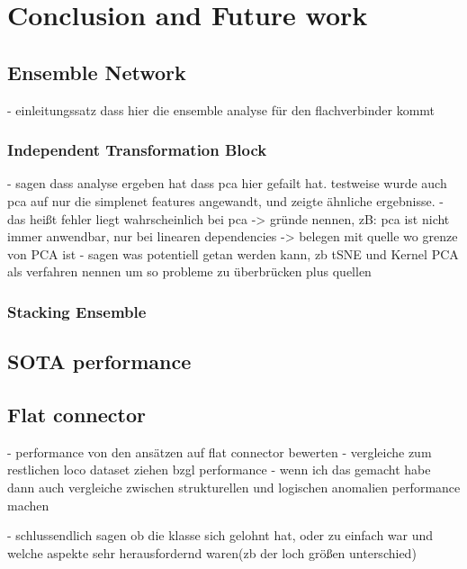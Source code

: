 \chapter{Conclusion and Future work}
\label{chap:conclusion}

\section{Ensemble Network}
\label{sec:ensembleconclusion}

- einleitungssatz dass hier die ensemble analyse für den flachverbinder kommt

\subsection{Independent Transformation Block}
\label{subsec:ITBfailconc}

- sagen dass analyse ergeben hat dass pca hier gefailt hat. testweise wurde auch pca auf nur die simplenet features angewandt, und zeigte ähnliche ergebnisse.
- das heißt fehler liegt wahrscheinlich bei pca
-> gründe nennen, zB: pca ist nicht immer anwendbar, nur bei linearen dependencies
-> belegen mit quelle wo grenze von PCA ist
- sagen was potentiell getan werden kann, zb tSNE und Kernel PCA als verfahren nennen um so probleme zu überbrücken plus quellen


\subsection{Stacking Ensemble}
\label{subsec:stackingconc}

\section{SOTA performance}
\label{sec:sotaperformanceconc}

\section{Flat connector}
\label{sec:flatconnectorconc}

- performance von den ansätzen auf flat connector bewerten
- vergleiche zum restlichen loco dataset ziehen bzgl performance
- wenn ich das gemacht habe dann auch vergleiche zwischen strukturellen und logischen anomalien performance machen

- schlussendlich sagen ob die klasse sich gelohnt hat, oder zu einfach war und welche aspekte sehr herausfordernd waren(zb der loch größen unterschied)

